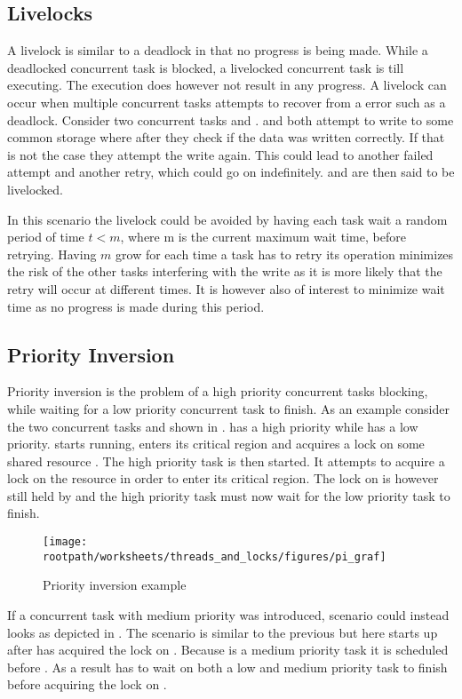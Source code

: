 \subsection{Livelocks} A livelock is similar to a deadlock in that no progress is being made. While a deadlocked concurrent task is blocked, a livelocked concurrent task is till executing. The execution does however not result in any progress. A livelock can occur when multiple concurrent tasks attempts to recover from a error such as a deadlock\cite[p. 457]{tanenbaum2008modern}. Consider two concurrent tasks  and .  and  both attempt to write to some common storage where after they check if the data was written correctly. If that is not the case they attempt the write again. This could lead to another failed attempt and another retry, which could go on indefinitely.  and  are then said to be livelocked.

In this scenario the livelock could be avoided by having each task wait a random period of time $t < m$, where m is the current maximum wait time, before retrying. Having $m$ grow for each time a task has to retry its operation minimizes the risk of the other tasks interfering with the write as it is more likely that the retry will occur at different times. It is however also of interest to minimize wait time as no progress is made during this period.

\subsection{Priority Inversion}
Priority inversion is the problem of a high priority concurrent tasks blocking, while waiting for a low priority concurrent task to finish\cite[p. 456]{tanenbaum2008modern}. As an example consider the two concurrent tasks  and  shown in .  has a high priority while  has a low priority.  starts running, enters its critical region and acquires a lock on some shared resource . The high priority task  is then started. It attempts to acquire a lock on the resource  in order to enter its critical region. The lock on  is however still held by  and the high priority task  must now wait for the low priority task  to finish.

\begin{figure}[htbp]
\centering
 \texttt{[image: \\rootpath/worksheets/threads\_and\_locks/figures/pi\_graf]} 
 \caption{Priority inversion example}
\label{fig:priority_inversion}
\end{figure}
If a concurrent task  with medium priority was introduced, scenario could instead looks as depicted in . The scenario is similar to the previous but here  starts up after  has acquired the lock on . Because  is a medium priority task it is scheduled before . As a result  has to wait on both a low and medium priority task to finish before acquiring the lock on .

